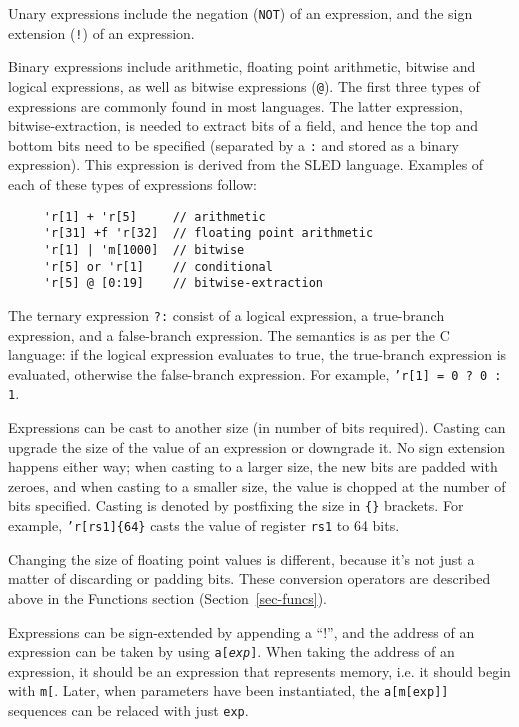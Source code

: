 Unary expressions include the negation (\texttt{NOT}) of an
expression, and the sign extension (\texttt{!}) of an expression.

Binary expressions include arithmetic, floating point arithmetic, bitwise and logical 
expressions, as well as bitwise expressions (\texttt{@}). 
The first three types of expressions are commonly found in 
most languages.  
The latter expression, bitwise-extraction, is needed to extract bits of 
a field, and hence the top and bottom bits need to be specified 
(separated by a \texttt{:} and stored as a binary expression).
This expression is derived from the SLED language.  
Examples of each of these types of expressions follow:
\begin{verbatim}
     'r[1] + 'r[5]     // arithmetic
     'r[31] +f 'r[32]  // floating point arithmetic
     'r[1] | 'm[1000]  // bitwise
     'r[5] or 'r[1]    // conditional
     'r[5] @ [0:19]    // bitwise-extraction
\end{verbatim}

The ternary expression \texttt{?:} consist of a logical expression, 
a true-branch expression, and a false-branch expression.  The 
semantics is as per the C language: if the logical expression 
evaluates to true, the true-branch expression is evaluated, otherwise
the false-branch expression.
For example, \texttt{'r[1] = 0 ? 0 : 1}.

Expressions can be cast to another size (in number of bits
required).  Casting can upgrade the size of the value of an
expression or downgrade it.  No sign extension happens either way;
when casting to a larger size, the new bits are padded with zeroes,
and when casting to a smaller size, the value is chopped at the 
number of bits specified.   
Casting is denoted by postfixing the size in \texttt{\{\}} brackets.
For example, \texttt{'r[rs1]\{64\}} casts the value of register
\texttt{rs1} to 64 bits.

Changing the size of floating point values is different, because it's not
just a matter of discarding or padding bits. These conversion operators
are described above in the Functions section (Section~\ref{sec-funcs}).

Expressions can be sign-extended by appending a ``!'', and the address of
an expression can be taken by using \texttt{a[{\it exp}]}. When taking the
address of an expression, it should be an expression that represents memory,
i.e. it should begin with \texttt{m[}. Later, when parameters have been instantiated,
the \texttt{a[m[exp]]} sequences can be relaced with just \texttt{exp}.

